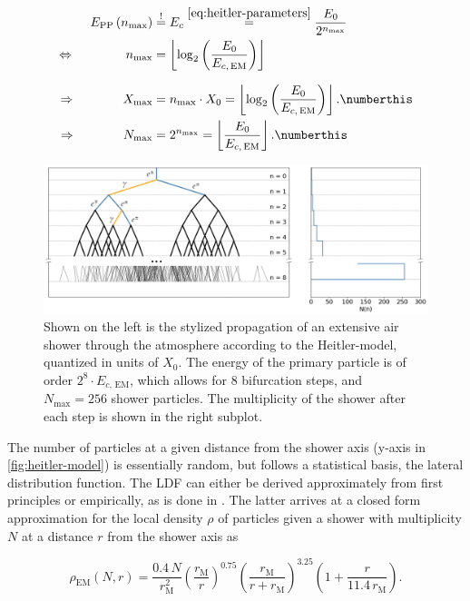 \begin{align*}
E_\text{PP}\,(n_\text{max}) &\stackrel{!}{=} E_c \stackrel{\eqref{eq:heitler-parameters}}{=} \frac{E_0}{2^{n_\text{max}}}\\
\Leftrightarrow \qquad \qquad n_\text{max} &= \left\lfloor \log_2 \left( \frac{E_0}{E_{c,\,\text{EM}}} \right) \right\rfloor \\[7pt]
\Rightarrow \qquad \qquad\!\! X_\text{max} &= n_\text{max}\cdot X_0 = \left\lfloor \log_2 \left( \frac{E_0}{E_{c,\,\text{EM}}} \right) \right\rfloor. \numberthis\label{eq:x-max} \\
\Rightarrow \qquad \qquad\!\! N_\text{max} &= 2^{n_\text{max}} = \left\lfloor \frac{E_0}{E_{c,\,\text{EM}}} \right\rfloor. \numberthis\label{eq:n-max}
\end{align*}

\begin{figure}
	\centering
	\includegraphics[width=\textwidth]{./imgs/heitler_shower.png}
	\caption{Shown on the left is the stylized propagation of an extensive air shower through the atmosphere according to the Heitler-model, quantized in units
	of $X_0$. The energy of the primary particle is of order $2^8\cdot E_{c,\,\text{EM}}$, which allows for 8 bifurcation steps, and $N_\text{max}=256$ shower particles. The
	multiplicity of the shower after each step is shown in the right subplot.}
	\label{fig:heitler-model}
\end{figure}

The number of particles at a given distance from the shower axis (y-axis in \autoref{fig:heitler-model}) is essentially random, but follows a statistical basis,
the lateral distribution function. The LDF can either be derived approximately from first principles \cite{kamata1958lateral} or empirically, as is done in 
\cite{greisen1960cosmic}. The latter arrives at a closed form approximation for the local density $\rho$ of particles given a shower with multiplicity $N$ at a 
distance $r$ from the shower axis as

\begin{equation}
\label{eq:NKG-electrons}
\rho_\text{EM}(N, r)=\frac{0.4\,N}{r_\text{M}^2} \left(\frac{r_\text{M}}{r}\right)^{0.75} \left(\frac{r_\text{M}}{r+r_\text{M}}\right)^{3.25}\left(1+\frac{r}{11.4\,r_\text{M}} \right).
\end{equation}

